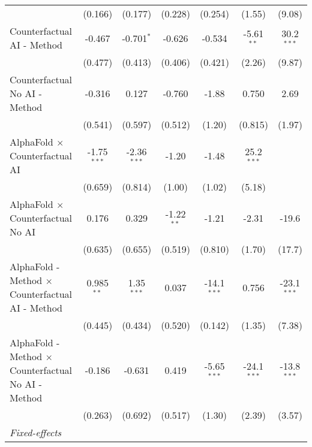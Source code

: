\begin{tabular}{lcccccc}
                                                              & (0.166)       & (0.177)       & (0.228)      & (0.254)       & (1.55)        & (9.08)\\   
   Counterfactual AI - Method                                 & -0.467        & -0.701$^{*}$  & -0.626       & -0.534        & -5.61$^{**}$  & 30.2$^{***}$\\   
                                                              & (0.477)       & (0.413)       & (0.406)      & (0.421)       & (2.26)        & (9.87)\\   
   Counterfactual No AI - Method                              & -0.316        & 0.127         & -0.760       & -1.88         & 0.750         & 2.69\\   
                                                              & (0.541)       & (0.597)       & (0.512)      & (1.20)        & (0.815)       & (1.97)\\   
   AlphaFold $\times$ Counterfactual AI                       & -1.75$^{***}$ & -2.36$^{***}$ & -1.20        & -1.48         & 25.2$^{***}$  &   \\   
                                                              & (0.659)       & (0.814)       & (1.00)       & (1.02)        & (5.18)        &   \\   
   AlphaFold $\times$ Counterfactual No AI                    & 0.176         & 0.329         & -1.22$^{**}$ & -1.21         & -2.31         & -19.6\\   
                                                              & (0.635)       & (0.655)       & (0.519)      & (0.810)       & (1.70)        & (17.7)\\   
   AlphaFold - Method $\times$ Counterfactual AI - Method     & 0.985$^{**}$  & 1.35$^{***}$  & 0.037        & -14.1$^{***}$ & 0.756         & -23.1$^{***}$\\   
                                                              & (0.445)       & (0.434)       & (0.520)      & (0.142)       & (1.35)        & (7.38)\\   
   AlphaFold - Method $\times$ Counterfactual No AI - Method  & -0.186        & -0.631        & 0.419        & -5.65$^{***}$ & -24.1$^{***}$ & -13.8$^{***}$\\   
                                                              & (0.263)       & (0.692)       & (0.517)      & (1.30)        & (2.39)        & (3.57)\\   
   \midrule
   \emph{Fixed-effects}\\

\end{tabular}
